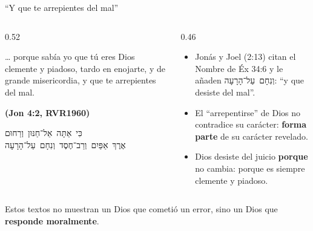 \documentclass[hyperref={bookmarks=false},aspectratio=169]{beamer}
\newcommand{\heb}[1]{\mbox{\foreignlanguage{hebrew}{#1}}}
\newcommand{\fuente}[1]{\par\hfill{\upshape\bfseries\footnotesize\textcolor{azul}{#1}}}
\newcommand{\destacar}[1]{\textbf{\textcolor{azul}{#1}}}
\begin{document}
\begin{frame}{``Y que te arrepientes del mal''}
\begin{columns}[t,onlytextwidth]
\begin{column}{0.52\textwidth}
\begin{cita}\ldots{} porque sabía yo que tú eres Dios clemente y piadoso, tardo en enojarte, y de grande misericordia, y que te arrepientes del mal.\fuente{(Jon 4:2, RVR1960)}\end{cita}
\begin{center}\heb{כִּי אַתָּה אֵל־חַנּוּן וְרַחוּם}\\[2pt]\heb{אֶרֶךְ אַפַּיִם וְרַב־חֶסֶד וְנִחָם עַל־הָרָעָה}\end{center}
\end{column}
\begin{column}{0.46\textwidth}\small
\begin{itemize}
\item Jonás y Joel (2:13) citan el Nombre de Éx 34:6 y le añaden \heb{וְנִחָם עַל־הָרָעָה}: ``y que desiste del mal''.
\item El ``arrepentirse'' de Dios no contradice su carácter: \destacar{forma parte} de su carácter revelado.
\item Dios desiste del juicio \destacar{porque} no cambia: porque es siempre clemente y piadoso.
\end{itemize}
\end{column}
\end{columns}\par\smallskip
\begin{tcolorbox}[colback=papiro,colframe=dorado,boxrule=1.2pt,arc=3pt]
\small Estos textos no muestran un Dios que cometió un error, sino un Dios que \destacar{responde moralmente}.
\end{tcolorbox}
\end{frame}
\end{document}
